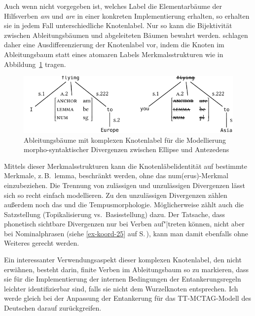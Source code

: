 Auch wenn nicht vorgegeben ist, welches Label die Elementarbäume der Hilfsverben {\it am} und {\it are} in einer konkreten Implementierung erhalten, so erhalten sie in jedem Fall unterschiedliche Knotenlabel. Nur so kann die Bijektivität zwischen Ableitungsbäumen und abgeleiteten Bäumen bewahrt werden. 
\cite{Lichte:Kallmeyer:10} schlagen daher eine Ausdifferenzierung der Knotenlabel vor, indem die Knoten im Ableitungsbaum statt eines atomaren Labels Merkmalsstrukturen wie in Abbildung~\ref{fig-deanchoring-9} tragen. 
\begin{figure}[t]
\centering
\includegraphics{graphics/abb822.pdf}
\caption{\label{fig-deanchoring-9}Ableitungsbäume mit komplexen Knotenlabel für die Modellierung morpho-syntaktischer Divergenzen zwischen Ellipse und Antezedens \citep[(7)]{Lichte:Kallmeyer:10}}
\end{figure}
Mittels dieser Merkmalsstrukturen kann die Knotenläbelidentität auf bestimmte Merkmale, z.\,B.\ {\sc lemma}, beschränkt werden, ohne das {\sc num(erus)}-Merkmal einzubeziehen. Die Trennung von zulässigen und unzulässigen Divergenzen lässt sich so recht einfach modellieren. Zu den unzulässigen Divergenzen zählen \cite{Lichte:Kallmeyer:10} au\ss erdem noch das  und die Tempusmorphologie. Möglicherweise zählt auch die Satzstellung (Topikalisierung vs.\ Basisstellung) dazu. Der Tatsache, dass phonetisch sichtbare Divergenzen nur bei Verben auf"|treten können, nicht aber bei Nominalphrasen (siehe \ref{ex-koord-25} auf S.\,\pageref{ex-koord-25}), kann man damit ebenfalls ohne Weiteres gerecht werden.

Ein interessanter Verwendungsaspekt dieser komplexen Knotenlabel, den \cite{Lichte:Kallmeyer:10} nicht erwähnen, besteht darin, finite Verben im Ableitungsbaum so zu markieren, dass sie für die Implementierung der internen Bedingungen der Entankerungsregeln leichter identifizierbar sind, falls sie nicht dem Wurzelknoten entsprechen. Ich werde gleich bei der Anpassung der Entankerung für das TT-MCTAG-Modell des Deutschen darauf zurückgreifen.


